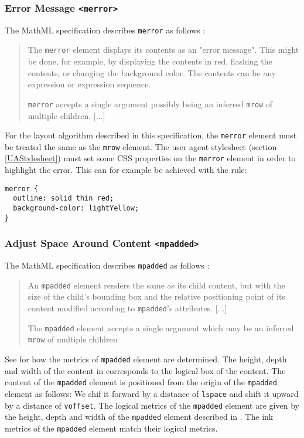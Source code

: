 \subsubsection{Error Message {\tt <merror>}}

The MathML specification describes {\tt merror} as follows \cite{MathML3}:
%
\begin{quote}
The {\tt merror} element displays its contents as an "error message". This
might be done, for example, by displaying the contents in red, flashing the
contents, or changing the background color. The contents can be any expression
or expression sequence.

{\tt merror} accepts a single argument possibly being an inferred {\tt mrow} of
multiple children. [...]
\end{quote}

For the layout algorithm described in this specification, the
{\tt merror} element must be treated the same as the {\tt mrow} element.
The user agent stylesheet (section \ref{UAStylesheet})
must set some CSS properties on the {\tt merror}
element in order to highlight the error. This can for example be achieved with
the rule:
%
\begin{lstlisting}
merror {
  outline: solid thin red;
  background-color: lightYellow;
}
\end{lstlisting}

\subsubsection{ Adjust Space Around Content {\tt <mpadded>}}\label{mpadded}

The MathML specification describes {\tt mpadded} as follows \cite{MathML3}:
%
\begin{quote}
An {\tt mpadded} element renders the same as its child content, but with the
size of the child's bounding box and the relative positioning point of its
content modified according to {\tt mpadded}'s attributes. [...]

The {\tt mpadded} element accepts a single argument which may be an inferred
{\tt mrow} of multiple children
\end{quote}

See \cite{MathML3} for how the metrics of {\tt mpadded} element are determined.
The height, depth and width of the content in \cite{MathML3} corresponds to
the logical box of the content. The content of the {\tt mpadded} element is
positioned from the origin of the {\tt mpadded} element as follows: We shif it
forward by a distance of {\tt lspace} and shift it upward by a distance of
{\tt voffset}. The logical metrics of the {\tt mpadded} element are given by the
height, depth and width of the {\tt mpadded} element described in
\cite{MathML3}. The ink metrics of the {\tt mpadded} element match their logical
metrics.

